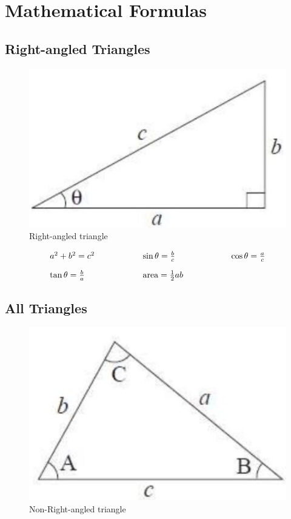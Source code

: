 \documentclass[12pt,a4paper]{article}
\begin{document}
\newpage
\section{Mathematical Formulas}

\subsection{Right-angled Triangles}

\begin{figure}[H]
    \centering
    \includegraphics[width=0.4\linewidth]{phys11-formulas-relativity-thermodynamics.png}
    \caption{Right-angled triangle}
    \label{fig:Right-angled triangle}
\end{figure}

\begin{align*}
  \begin{array}{l@{\hspace{2cm}}l@{\hspace{2cm}}l}
    a^2 + b^2 = c^2 & \sin \theta = \frac{b}{c} & \cos \theta = \frac{a}{c} \\[1em]
    \tan \theta = \frac{b}{a} & \text{area} = \frac{1}{2}ab &
  \end{array}
\end{align*}

\subsection{All Triangles}
\begin{figure}[H]
    \centering
    \includegraphics[width=0.4\linewidth]{phys11-formulas-newton-relativity-thermodynamics.png}
    \caption{Non-Right-angled triangle}
    \label{fig:Non-Right-angled triangle}
\end{figure}
\end{document}
